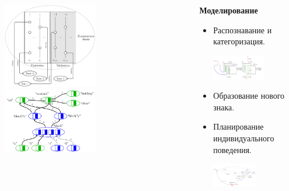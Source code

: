\documentclass[default]{beamer}
\begin{document}
\begin{frame}
\begin{columns}
\begin{column}{0.6\textwidth}
\begin{columns}
\begin{column}{0.5\textwidth}
\begin{center}
									\includegraphics[width=0.5\textwidth]{causnet/caus_matr_ru}
									\includegraphics[width=0.5\textwidth]{examples/plan/plan_nets-3}
								\end{center}
							\end{column}
						\end{columns}
			\end{column}
			\begin{column}{0.4\textwidth}
				\textbf{{\scriptsize Моделирование}}
				\begin{itemize}
					\item Распознавание и категоризация.
					\begin{center}
						\includegraphics[width=0.6\textwidth]{algo/perception}
					\end{center}
					\item Образование нового знака.
					\item Планирование индивидуального поведения.
					\begin{center}
						\includegraphics[width=0.5\textwidth]{algo/ru/map_ru}

\end{center}
\end{itemize}
\end{column}
\end{columns}
\end{frame}
\end{document}
